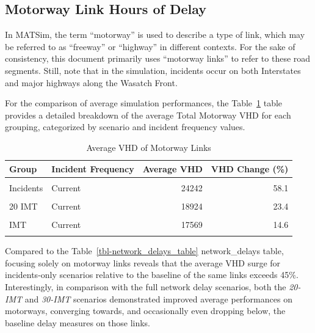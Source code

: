 \documentclass[fancy, oneside, mastersfancy, ms]{byuthesis}
\begin{document}
\hypertarget{motorway-link-hours-of-delay}{%
\subsection{Motorway Link Hours of
Delay}\label{motorway-link-hours-of-delay}}

In MATSim, the term ``motorway'' is used to describe a type of link,
which may be referred to as ``freeway'' or ``highway'' in different
contexts. For the sake of consistency, this document primarily uses
``motorway links'' to refer to these road segments. Still, note that in
the simulation, incidents occur on both Interstates and major highways
along the Wasatch Front.

For the comparison of average simulation performances, the
Table~\ref{tbl-motorway_delays_table} table provides a detailed
breakdown of the average Total Motorway VHD for each grouping,
categorized by scenario and incident frequency values.

\hypertarget{tbl-motorway_delays_table}{}
\begin{table}
\caption{\label{tbl-motorway_delays_table}Average VHD of Motorway Links }\tabularnewline

\centering
\begin{tabular}[t]{llrr}
\toprule
\textbf{Group} & \textbf{Incident Frequency} & \textbf{Average VHD} & \textbf{VHD Change (\%)}\\
\midrule
\cellcolor{gray!6}{Baseline} & \cellcolor{gray!6}{-} & \cellcolor{gray!6}{15335} & \cellcolor{gray!6}{0.0}\\
Incidents & Current & 24242 & 58.1\\
\cellcolor{gray!6}{Incidents} & \cellcolor{gray!6}{Increased} & \cellcolor{gray!6}{22321} & \cellcolor{gray!6}{45.6}\\
20 IMT & Current & 18924 & 23.4\\
\cellcolor{gray!6}{20 IMT} & \cellcolor{gray!6}{Increased} & \cellcolor{gray!6}{19176} & \cellcolor{gray!6}{25.0}\\
\addlinespace
30 IMT & Current & 17569 & 14.6\\
\cellcolor{gray!6}{30 IMT} & \cellcolor{gray!6}{Increased} & \cellcolor{gray!6}{18327} & \cellcolor{gray!6}{19.5}\\
\bottomrule
\end{tabular}
\end{table}

Compared to the Table~\ref{tbl-network_delays_table} network\_delays
table, focusing solely on motorway links reveals that the average VHD
surge for incidents-only scenarios relative to the baseline of the same
links exceeds 45\%. Interestingly, in comparison with the full network
delay scenarios, both the \emph{20-IMT} and \emph{30-IMT} scenarios
demonstrated improved average performances on motorways, converging
towards, and occasionally even dropping below, the baseline delay
measures on those links.
\end{document}
